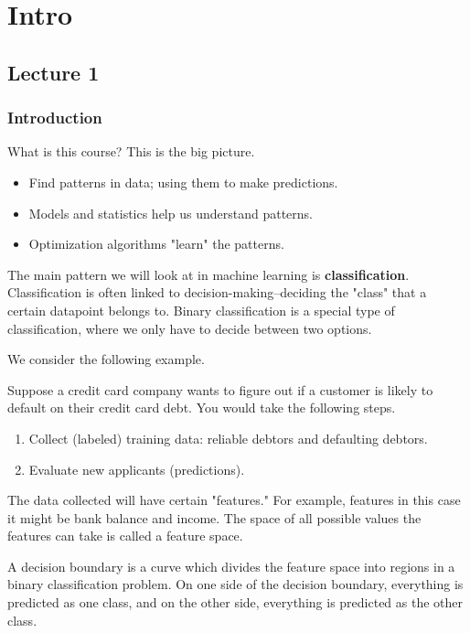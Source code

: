 \section{Intro}

\subsection{Lecture 1}

\subsubsection{Introduction}

What is this course? This is the big picture.

\begin{itemize}
    \item Find patterns in data; using them to make predictions.
    \item Models and statistics help us understand patterns.
    \item Optimization algorithms "learn" the patterns.
\end{itemize}

The main pattern we will look at in machine learning is \textbf{classification}. Classification is often linked to decision-making--deciding the "class"
that a certain datapoint belongs to. Binary classification is a special type of classification, where we only have to decide between two options.

We consider the following example.

\begin{example}
    Suppose a credit card company wants to figure out if a customer is likely to default on their credit card debt. You would take the following steps.
    \begin{enumerate}
        \item Collect (labeled) training data: reliable debtors and defaulting debtors.
        \item Evaluate new applicants (predictions).
    \end{enumerate}

    The data collected will have certain "features." For example, features in this case it might be bank balance and income. The space of all possible values the features can take is called a feature space.
\end{example}

\begin{definition}
    A decision boundary is a curve which divides the feature space into regions in a binary classification problem. On one side of the decision boundary, everything is predicted as one class, and on the other side, everything is predicted as the other class.
\end{definition}

